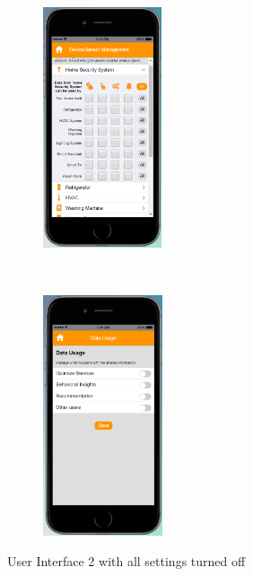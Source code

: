 \begin{figure}
\begin{subfigure}[t]{0.2\textwidth}
	\end{subfigure}%
	~~~~~
	\begin{subfigure}[t]{0.2\textwidth}
		\centering
		\includegraphics[height=2.8in]{figures/ui2allOff3.png}
	\end{subfigure}%
	~~~~~
	\begin{subfigure}[t]{0.2\textwidth}
		\centering
		\includegraphics[height=2.8in]{figures/ui2allOff4.png}
	\end{subfigure}%
	\caption{User Interface 2 with all settings turned off}
	\label{fig:ui2AllOff}
\end{figure}

